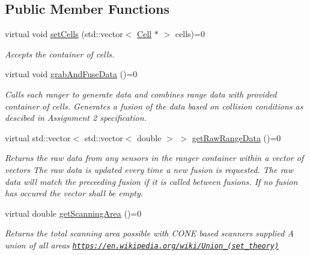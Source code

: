 \subsection*{Public Member Functions}
\begin{DoxyCompactItemize}
\item 
virtual void \hyperlink{class_ranger_fusion_interface_ab0b45c2c462124ce74d54eb226044beb}{set\+Cells} (std\+::vector$<$ \hyperlink{class_cell}{Cell} $\ast$ $>$ cells)=0
\begin{DoxyCompactList}\small\item\em Accepts the container of cells. \end{DoxyCompactList}\item 
virtual void \hyperlink{class_ranger_fusion_interface_ada6afdab2ce6d58a1bd0134f5e2be23f}{grab\+And\+Fuse\+Data} ()=0\hypertarget{class_ranger_fusion_interface_ada6afdab2ce6d58a1bd0134f5e2be23f}{}\label{class_ranger_fusion_interface_ada6afdab2ce6d58a1bd0134f5e2be23f}

\begin{DoxyCompactList}\small\item\em Calls each ranger to generate data and combines range data with provided container of cells. Generates a \textquotesingle{}fusion\textquotesingle{} of the data based on collision conditions as descibed in Assignment 2 specification. \end{DoxyCompactList}\item 
virtual std\+::vector$<$ std\+::vector$<$ double $>$ $>$ \hyperlink{class_ranger_fusion_interface_a9d60ca5866261026b870d7c0171587f5}{get\+Raw\+Range\+Data} ()=0
\begin{DoxyCompactList}\small\item\em Returns the raw data from any sensors in the ranger container within a vector of vectors The raw data is updated every time a new fusion is requested. The raw data will match the preceeding fusion if it is called between fusions. If no fusion has occured the vector shall be empty. \end{DoxyCompactList}\item 
virtual double \hyperlink{class_ranger_fusion_interface_a65155605804376da4f67baf3c6f97f40}{get\+Scanning\+Area} ()=0
\begin{DoxyCompactList}\small\item\em Returns the total scanning area possible with C\+O\+NE based scanners supplied A union of all areas \href{https://en.wikipedia.org/wiki/Union_(set_theory)}{\tt https\+://en.\+wikipedia.\+org/wiki/\+Union\+\_\+(set\+\_\+theory)} \end{DoxyCompactList}\end{DoxyCompactItemize}


